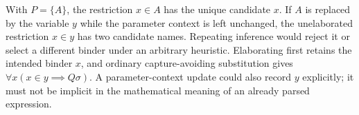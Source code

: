 \begin{example}
With $P=\{A\}$, the restriction $x\in A$ has the unique candidate $x$.
If $A$ is replaced by the variable $y$ while the parameter context is
left unchanged, the unelaborated restriction $x\in y$ has two candidate
names. Repeating inference would reject it or select a different binder
under an arbitrary heuristic. Elaborating first retains the intended
binder $x$, and ordinary capture-avoiding substitution gives
$\forall x(x\in y\implies Q\sigma)$. A parameter-context update could
also record $y$ explicitly; it must not be implicit in the mathematical
meaning of an already parsed expression.
\end{example}







